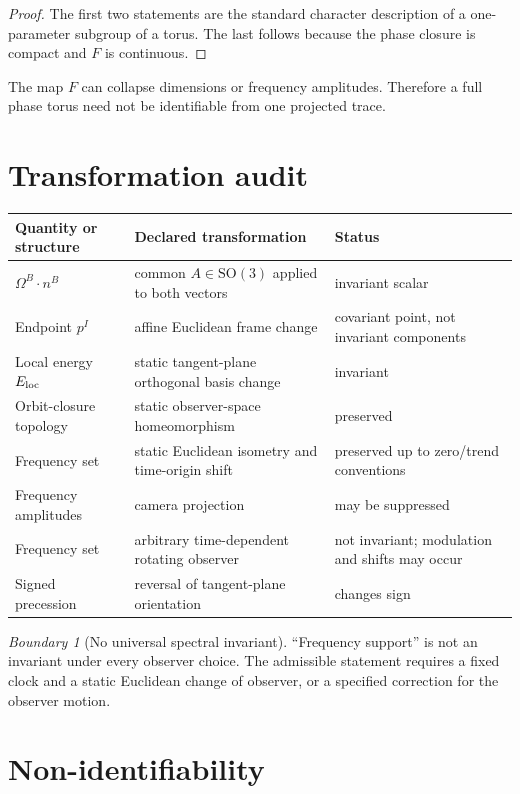 \documentclass[11pt,a4paper]{article}
\theoremstyle{definition}
\theoremstyle{plain}
\theoremstyle{remark}
\newtheorem{warning}[definition]{Boundary}
\newcommand{\SO}{\mathrm{SO}}
\begin{document}
\begin{proof}
The first two statements are the standard character description of a
one-parameter subgroup of a torus. The last follows because the phase
closure is compact and \(F\) is continuous.
\end{proof}

The map \(F\) can collapse dimensions or frequency amplitudes.
Therefore a full phase torus need not be identifiable from one
projected trace.

\section{Transformation audit}

\begin{longtable}{L{34mm}L{48mm}L{68mm}}
\toprule
Quantity or structure & Declared transformation & Status \\
\midrule
\endhead
\(\Omega^B\cdot n^B\) & common \(A\in\SO(3)\) applied to both vectors
& invariant scalar \\
Endpoint \(p^I\) & affine Euclidean frame change & covariant point,
not invariant components \\
Local energy \(E_{\rm loc}\) & static tangent-plane orthogonal basis
change & invariant \\
Orbit-closure topology & static observer-space homeomorphism &
preserved \\
Frequency set & static Euclidean isometry and time-origin shift &
preserved up to zero/trend conventions \\
Frequency amplitudes & camera projection & may be suppressed \\
Frequency set & arbitrary time-dependent rotating observer & not
invariant; modulation and shifts may occur \\
Signed precession & reversal of tangent-plane orientation & changes
sign \\
\bottomrule
\end{longtable}

\begin{warning}[No universal spectral invariant]
``Frequency support'' is not an invariant under every observer
choice. The admissible statement requires a fixed clock and a static
Euclidean change of observer, or a specified correction for the
observer motion.
\end{warning}

\section{Non-identifiability}
\end{document}
